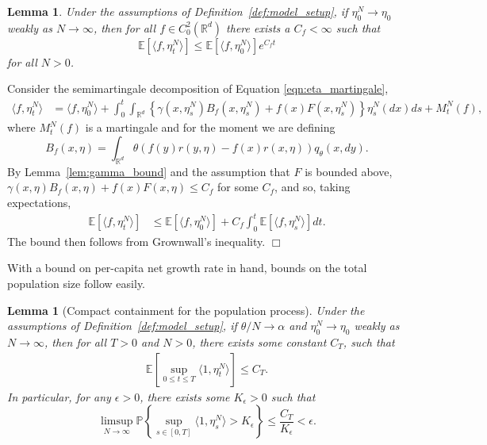 \documentclass[12pt]{article}
\newenvironment {proof}{{\noindent\bf Proof }}{\hfill $\Box$ \medskip}
\newtheorem{lemma}[theorem]{Lemma}
\newcommand{\IP}{\mathbb P}
\newcommand{\IE}{\mathbb E}
\newcommand{\IR}{\mathbb R}
\begin{document}
\begin{lemma}
    \label{lem:eta_f_bound}
    Under the assumptions of Definition~\ref{def:model_setup},
    if $\eta^{N}_0 \to \eta_0$ weakly as $N \to \infty$,
    then for all $f \in C^2_0(\IR^d)$ there exists a $C_f < \infty$
    such that
    $$
        \IE[\langle f, \eta^N_t \rangle]
        \le
        \IE[\langle f, \eta^N_0 \rangle]
        e^{C_f t}
    $$
    for all $N > 0$.
\end{lemma}

\begin{proof}
    Consider the semimartingale decomposition of Equation \eqref{eqn:eta_martingale},
    \begin{align} \label{eqn:eta_f_mgale_decomp}
        \langle f, \eta^N_t \rangle
        &=
        \langle f, \eta^N_0 \rangle
        + \int_0^t \int_{\IR^d} \left\{
            \gamma(x, \eta^N_s) B_f(x, \eta^N_s)
            + f(x) F(x, \eta^N_s)
            \right\} \eta^N_s(dx) ds
        + M^N_t(f) ,
    \end{align}
    where $M^N_t(f)$ is a martingale and for the moment we are defining
    \begin{equation*}
        B_f(x, \eta) = \int_{\IR^d} \theta (f(y) r(y, \eta) - f(x) r(x, \eta)) q_\theta(x, dy) .
    \end{equation*}
    By Lemma~\ref{lem:gamma_bound} and the assumption that $F$ is bounded above,
    $\gamma(x, \eta) B_f(x, \eta) + f(x) F(x, \eta) \le C_f$ for some $C_f$,
    and so, taking expectations,
    \begin{align*}
        \IE\left[ \langle f, \eta^N_t \rangle \right]
        &\le
        \IE\left[ \langle f, \eta^N_0 \rangle \right]
        + C_f \int_0^t \IE\left[ \langle f, \eta^N_s \rangle \right] dt .
    \end{align*}
    The bound then follows from Grownwall's inequality.
\end{proof}

With a bound on per-capita net growth rate in hand,
bounds on the total population size follow easily.

\begin{lemma}[Compact containment for the population process]
    \label{lem:eta_compact_containment}
    Under the assumptions of Definition~\ref{def:model_setup},
    if $\theta/N \to \alpha$ and $\eta^{N}_0 \to \eta_0$ weakly as $N \to \infty$,
    then for all $T>0$ and $N > 0$, there exists some constant $C_T$,
    such that
    \begin{align}
        \label{eqn:eta_mass_bound}
        \IE\left[
            \sup_{0 \le t \le T}
            \langle 1, \eta^{N}_t \rangle
        \right]
        \le C_T .
    \end{align}
    In particular, for any $\epsilon > 0$, there exists some $K_{\epsilon}>0$ such that
    \begin{equation}
    \limsup_{N \to \infty}
        \IP \left\{ \sup_{s \in [0,T]}
            \langle 1 ,\eta^{N}_{s}\rangle
            > K_\epsilon \right\}
        \leq \frac{C_T}{K_{\epsilon}}
        < \epsilon .
    \end{equation}
\end{lemma}
\end{document}
